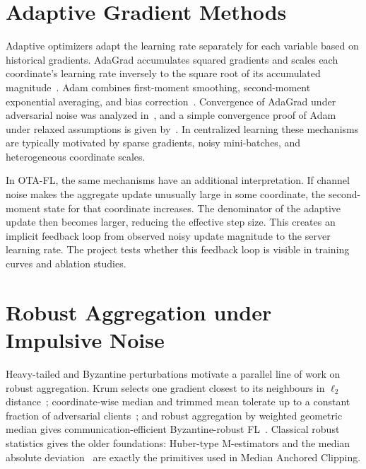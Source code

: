 \section{Adaptive Gradient Methods}
Adaptive optimizers adapt the learning rate separately for each
variable based on historical gradients. AdaGrad accumulates squared
gradients and scales each coordinate's learning rate inversely to the
square root of its accumulated magnitude~\cite{duchi2011adaptive}. Adam
combines first-moment smoothing, second-moment exponential averaging,
and bias correction~\cite{kingma2015adam}. Convergence of AdaGrad
under adversarial noise was analyzed in~\cite{ward2019adagrad}, and a
simple convergence proof of Adam under relaxed assumptions is given
by~\cite{defossez2022adamsimple}. In centralized learning these
mechanisms are typically motivated by sparse gradients, noisy
mini-batches, and heterogeneous coordinate scales.

In OTA-FL, the same mechanisms have an additional interpretation. If
channel noise makes the aggregate update unusually large in some
coordinate, the second-moment state for that coordinate increases. The
denominator of the adaptive update then becomes larger, reducing the
effective step size. This creates an implicit feedback loop from
observed noisy update magnitude to the server learning rate. The
project tests whether this feedback loop is visible in training curves
and ablation studies.

\section{Robust Aggregation under Impulsive Noise}
Heavy-tailed and Byzantine perturbations motivate a parallel line of
work on robust aggregation. Krum selects one gradient closest to its
neighbours in $\ell_2$ distance~\cite{blanchard2017krum}; coordinate-wise
median and trimmed mean tolerate up to a constant fraction of
adversarial clients~\cite{yin2018byzantine}; and robust aggregation by
weighted geometric median gives communication-efficient Byzantine-robust
FL~\cite{pillutla2022robust}. Classical robust statistics gives the
older foundations: Huber-type M-estimators and the median absolute
deviation~\cite{huber2009robust,hampel1986robustbook} are exactly the
primitives used in Median Anchored Clipping.

